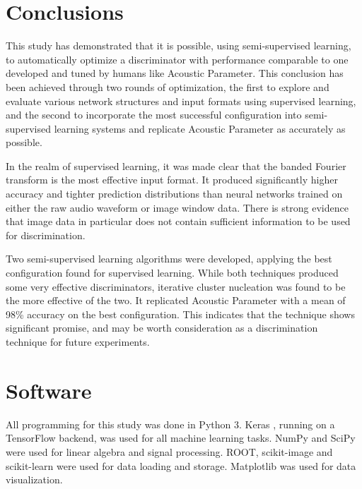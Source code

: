 \documentclass[10pt]{article}
\begin{document}
\section{Conclusions}

This study has demonstrated that it is possible, using semi-supervised learning, to automatically optimize a discriminator with performance comparable to one developed and tuned by humans like Acoustic Parameter. This conclusion has been achieved through two rounds of optimization, the first to explore and evaluate various network structures and input formats using supervised learning, and the second to incorporate the most successful configuration into semi-supervised learning systems and replicate Acoustic Parameter as accurately as possible.

In the realm of supervised learning, it was made clear that the banded Fourier transform is the most effective input format. It produced significantly higher accuracy and tighter prediction distributions than neural networks trained on either the raw audio waveform or image window data. There is strong evidence that image data in particular does not contain sufficient information to be used for discrimination.

Two semi-supervised learning algorithms were developed, applying the best configuration found for supervised learning. While both techniques produced some very effective discriminators, iterative cluster nucleation was found to be the more effective of the two. It replicated Acoustic Parameter with a mean of 98\% accuracy on the best configuration. This indicates that the technique shows significant promise, and may be worth consideration as a discrimination technique for future experiments.

\section{Software}

All programming for this study was done in Python 3. Keras \cite{keras}, running on a TensorFlow backend, was used for all machine learning tasks. NumPy and SciPy were used for linear algebra and signal processing. ROOT, scikit-image and scikit-learn were used for data loading and storage. Matplotlib was used for data visualization.

\printbibliography
\end{document}
